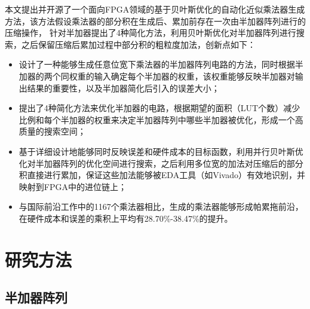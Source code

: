 本文提出并开源了一个面向FPGA领域的基于贝叶斯优化的自动化近似乘法器生成方法，该方法假设乘法器的部分积在生成后、累加前存在一次由半加器阵列进行的压缩操作，
针对半加器提出了4种简化方法，利用贝叶斯优化对半加器阵列进行搜索，之后保留压缩后累加过程中部分积的粗粒度加法，创新点如下：
\begin{itemize}
    \item 设计了一种能够生成任意位宽下乘法器的半加器阵列电路的方法，同时根据半加器的两个同权重的输入确定每个半加器的权重，该权重能够反映半加器对输出结果的重要性，以及半加器简化后引入的误差大小；
    \item 提出了4种简化方法来优化半加器的电路，根据期望的面积（LUT个数）减少比例和每个半加器的权重来决定半加器阵列中哪些半加器被优化，形成一个高质量的搜索空间；
    \item 基于详细设计地能够同时反映误差和硬件成本的目标函数，利用并行贝叶斯优化对半加器阵列的优化空间进行搜索，之后利用多位宽的加法对压缩后的部分积直接进行累加，保证这些加法能够被EDA工具（如Vivado）有效地识别，并映射到FPGA中的进位链上；
    \item 与国际前沿工作中的1167个乘法器相比，生成的乘法器能够形成帕累拖前沿，在硬件成本和误差的乘积上平均有28.70\%-38.47\%的提升。
\end{itemize}

\section{研究方法}

\subsection{半加器阵列}

